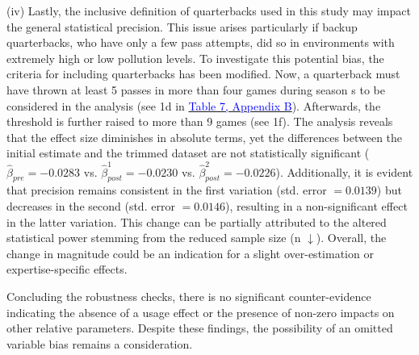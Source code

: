 \documentclass[12pt,a4paper]{article}
\newcommand{\mylink}[2]{\hyperref[#1]{\textcolor{blue}{#2}}}
\begin{document}
{(iv) Lastly, the inclusive definition of quarterbacks used in this study may impact the general statistical precision. This issue arises particularly if backup quarterbacks, who have only a few pass attempts, did so in environments with extremely high or low pollution levels. To investigate this potential bias, the criteria for including quarterbacks has been modified. Now, a quarterback must have thrown at least 5 passes in more than four games during season s to be considered in the analysis (see 1d in \mylink{A:T3}{Table 7, Appendix B}). Afterwards, the threshold is further raised to more than 9 games (see 1f). The analysis reveals that the effect size diminishes in absolute terms, yet the differences between the initial estimate and the trimmed dataset are not statistically significant ($\hat{\beta}_{pre} = -0.0283$ vs. $\hat{\beta}^{1}_{post} = -0.0230$ vs. $\hat{\beta}^{2}_{post} = -0.0226$). Additionally, it is evident that precision remains consistent in the first variation (std. error $ = 0.0139$) but decreases in the second (std. error $ = 0.0146$), resulting in a non-significant effect in the latter variation. This change can be partially attributed to the altered statistical power stemming from the reduced sample size (n $\downarrow$). Overall, the change in magnitude could be an indication for a slight over-estimation or expertise-specific effects.


Concluding the robustness checks, there is no significant counter-evidence indicating the absence of a usage effect or the presence of non-zero impacts on other relative parameters. Despite these findings, the possibility of an omitted variable bias remains a consideration.
\clearpage
}
\end{document}
